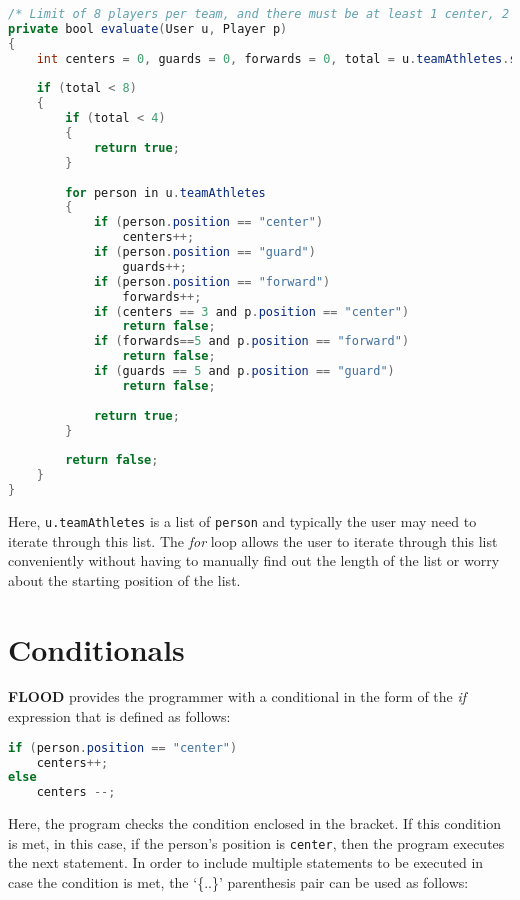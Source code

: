 \documentclass[12pt]{report}
\begin{document}
\begin{lstlisting}[language=Java,label=some-code,caption=For loop]
/* Limit of 8 players per team, and there must be at least 1 center, 2 guards and 2 forwards per team. */
private bool evaluate(User u, Player p)
{
	int centers = 0, guards = 0, forwards = 0, total = u.teamAthletes.size();
	
	if (total < 8)
	{
		if (total < 4)
		{
			return true;
		}
		
		for person in u.teamAthletes
		{
			if (person.position == "center")
				centers++;
			if (person.position == "guard")
				guards++;
			if (person.position == "forward")
				forwards++;
			if (centers == 3 and p.position == "center")
				return false;
			if (forwards==5 and p.position == "forward")
				return false;
			if (guards == 5 and p.position == "guard")
				return false;
		
			return true;
		}
		
		return false;
	}
}
\end{lstlisting}

\begin{doublespace}
Here, \texttt{u.teamAthletes} is a list of \texttt{person} and typically the user may need to iterate through this list. The \textit{for} loop allows the user to iterate through this list conveniently without having to manually find out the length of the list or worry about the starting position of the list.
\end{doublespace}

\section{Conditionals}

\begin{doublespace}
\textbf{FLOOD} provides the programmer with a conditional in the form of the \textit{if} expression that is defined as follows:
\end{doublespace}

\begin{lstlisting}[language=Java,label=some-code,caption=if conditional]
if (person.position == "center")
	centers++;
else
	centers --;
\end{lstlisting}

\begin{doublespace}
Here, the program checks the condition enclosed in the bracket. If this condition is met, in this case, if the person's position is \texttt{center}, then the program executes the next statement. In order to include multiple statements to be executed in case the condition is met, the `\{..\}'
parenthesis pair can be used as follows:
\end{doublespace}
\end{document}

